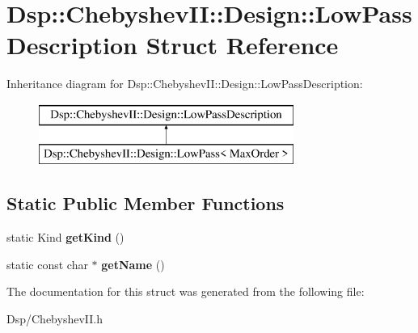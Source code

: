 \hypertarget{structDsp_1_1ChebyshevII_1_1Design_1_1LowPassDescription}{\section{Dsp\-:\-:Chebyshev\-I\-I\-:\-:Design\-:\-:Low\-Pass\-Description Struct Reference}
\label{structDsp_1_1ChebyshevII_1_1Design_1_1LowPassDescription}
}
Inheritance diagram for Dsp\-:\-:Chebyshev\-I\-I\-:\-:Design\-:\-:Low\-Pass\-Description\-:\begin{figure}[H]
\begin{center}
\leavevmode
\includegraphics[height=2.000000cm]{structDsp_1_1ChebyshevII_1_1Design_1_1LowPassDescription}
\end{center}
\end{figure}
\subsection*{Static Public Member Functions}
\begin{DoxyCompactItemize}
\item 
\hypertarget{structDsp_1_1ChebyshevII_1_1Design_1_1LowPassDescription_ade91927a3dbc2a80652b9d48ffc16c75}{static Kind {\bfseries get\-Kind} ()}\label{structDsp_1_1ChebyshevII_1_1Design_1_1LowPassDescription_ade91927a3dbc2a80652b9d48ffc16c75}

\item 
\hypertarget{structDsp_1_1ChebyshevII_1_1Design_1_1LowPassDescription_aa82a148e54d93f8166f889aa82c7e8e0}{static const char $\ast$ {\bfseries get\-Name} ()}\label{structDsp_1_1ChebyshevII_1_1Design_1_1LowPassDescription_aa82a148e54d93f8166f889aa82c7e8e0}

\end{DoxyCompactItemize}


The documentation for this struct was generated from the following file\-:\begin{DoxyCompactItemize}
\item 
Dsp/Chebyshev\-I\-I.\-h\end{DoxyCompactItemize}
